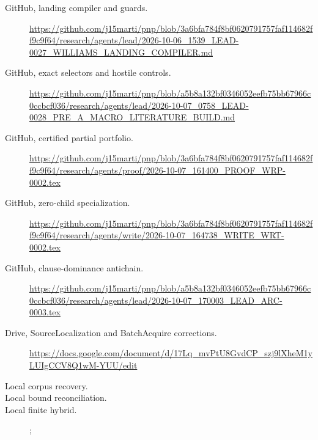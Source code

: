\documentclass[10pt]{article}
\begin{document}
\begin{description}
\item[GitHub, landing compiler and guards.]
\url{https://github.com/j15marti/pnp/blob/3a6bfa784f8bf0620791757faf114682ff9c9f64/research/agents/lead/2026-10-06_1539_LEAD-0027_WILLIAMS_LANDING_COMPILER.md}
\item[GitHub, exact selectors and hostile controls.]
\url{https://github.com/j15marti/pnp/blob/a5b8a132bf0346052eefb75bb67966c0ccbcf036/research/agents/lead/2026-10-07_0758_LEAD-0028_PRE_A_MACRO_LITERATURE_BUILD.md}
\item[GitHub, certified partial portfolio.]
\url{https://github.com/j15marti/pnp/blob/3a6bfa784f8bf0620791757faf114682ff9c9f64/research/agents/proof/2026-10-07_161400_PROOF_WRP-0002.tex}
\item[GitHub, zero-child specialization.]
\url{https://github.com/j15marti/pnp/blob/3a6bfa784f8bf0620791757faf114682ff9c9f64/research/agents/write/2026-10-07_164738_WRITE_WRT-0002.tex}
\item[GitHub, clause-dominance antichain.]
\url{https://github.com/j15marti/pnp/blob/a5b8a132bf0346052eefb75bb67966c0ccbcf036/research/agents/lead/2026-10-07_170003_LEAD_ARC-0003.tex}
\item[Drive, SourceLocalization and BatchAcquire corrections.]
\url{https://docs.google.com/document/d/17Lq_mvPtU8GvdCP_szj9lXheM1yLUIgCCV8Q1wM-YUU/edit}
\item[Local corpus recovery.]
\item[Local bound reconciliation.]
\item[Local finite hybrid.]
;
\end{description}
\end{document}
